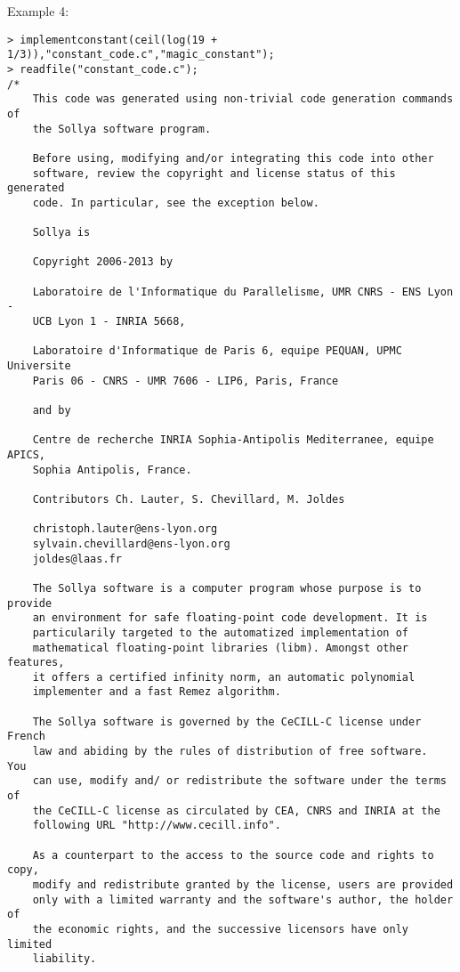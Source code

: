 \noindent Example 4: 
\begin{center}\begin{minipage}{15cm}\begin{Verbatim}[frame=single]
> implementconstant(ceil(log(19 + 1/3)),"constant_code.c","magic_constant");
> readfile("constant_code.c");
/*
    This code was generated using non-trivial code generation commands of
    the Sollya software program.
    
    Before using, modifying and/or integrating this code into other
    software, review the copyright and license status of this generated
    code. In particular, see the exception below.
    
    Sollya is
    
    Copyright 2006-2013 by
    
    Laboratoire de l'Informatique du Parallelisme, UMR CNRS - ENS Lyon -
    UCB Lyon 1 - INRIA 5668,
    
    Laboratoire d'Informatique de Paris 6, equipe PEQUAN, UPMC Universite
    Paris 06 - CNRS - UMR 7606 - LIP6, Paris, France
    
    and by
    
    Centre de recherche INRIA Sophia-Antipolis Mediterranee, equipe APICS,
    Sophia Antipolis, France.
    
    Contributors Ch. Lauter, S. Chevillard, M. Joldes
    
    christoph.lauter@ens-lyon.org
    sylvain.chevillard@ens-lyon.org
    joldes@laas.fr
    
    The Sollya software is a computer program whose purpose is to provide
    an environment for safe floating-point code development. It is
    particularily targeted to the automatized implementation of
    mathematical floating-point libraries (libm). Amongst other features,
    it offers a certified infinity norm, an automatic polynomial
    implementer and a fast Remez algorithm.
    
    The Sollya software is governed by the CeCILL-C license under French
    law and abiding by the rules of distribution of free software.  You
    can use, modify and/ or redistribute the software under the terms of
    the CeCILL-C license as circulated by CEA, CNRS and INRIA at the
    following URL "http://www.cecill.info".
    
    As a counterpart to the access to the source code and rights to copy,
    modify and redistribute granted by the license, users are provided
    only with a limited warranty and the software's author, the holder of
    the economic rights, and the successive licensors have only limited
    liability.
    

\end{Verbatim}
\end{minipage}
\end{center}

